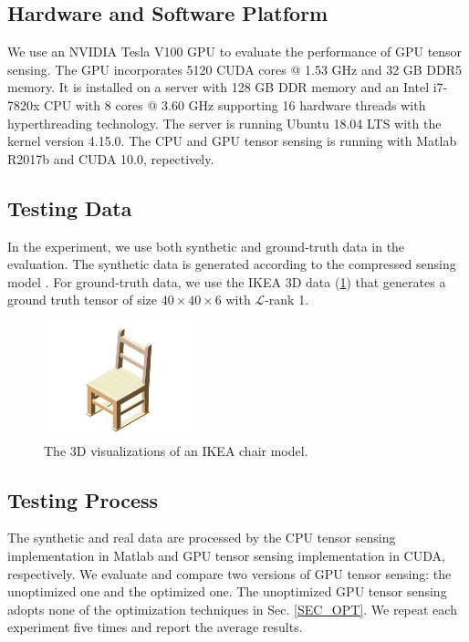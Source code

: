 \documentclass[futureinternet,article,submit,moreauthors,pdftex,10pt,a4paper]{Definitions/mdpi}
\theoremstyle{plain}
\theoremstyle{definition}
\theoremstyle{remark}
\begin{document}
\subsection{Hardware and Software Platform}
We use an NVIDIA Tesla V100 GPU to evaluate the performance of GPU tensor sensing. The GPU incorporates 5120 CUDA cores @ 1.53 GHz and 32 GB DDR5 memory. It is installed on a server with 128 GB DDR memory and an Intel i7-7820x CPU with 8 cores @ 3.60 GHz supporting 16 hardware threads with hyperthreading technology. The server is running Ubuntu 18.04 LTS with the kernel version 4.15.0. The CPU and GPU tensor sensing is running with Matlab R2017b and  CUDA 10.0, repectively.

\subsection{Testing Data}
In the experiment, we use both synthetic and ground-truth data in the evaluation. The synthetic data is generated according to the compressed sensing model \cite{matsuda2017multi}. For ground-truth data, we use the IKEA 3D data (\ref{Fig:chair}) that generates a ground truth tensor of size $40 \times 40 \times 6$ with $\mathcal{L}$-rank 1.
\begin{figure}[H]
\centering
\includegraphics[width=0.4\textwidth]{chair.png}
\caption{The 3D visualizations of an IKEA chair model.}
\label{Fig:chair}
\end{figure}

\subsection{Testing Process}
The synthetic and real data are processed by the CPU tensor sensing implementation in Matlab and GPU tensor sensing implementation in CUDA, respectively. We evaluate and compare two versions of GPU tensor sensing: the unoptimized one and the optimized one. The unoptimized GPU tensor sensing adopts none of the optimization techniques in Sec. \ref{SEC_OPT}.  We repeat each experiment five times and report the average results.
\end{document}
